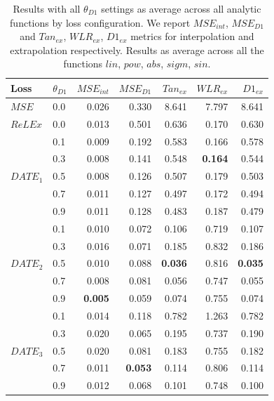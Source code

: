 \documentclass[runningheads]{llncs}
\begin{document}

\begin{table}[tb]
 \centering
 \begin{tabular}{l|l|rr|rrr}
 Loss & $\theta_{D1}$ & $MSE_{int}$ & $MSE_{D1}$ & $Tan_{ex}$ & $WLR_{ex}$ & $D1_{ex}$ \\
 \hline

 \hline
 $MSE$ & 0.0 & 0.026 & 0.330 & 8.641 & 7.797 & 8.641 \\
 $ReLEx$ & 0.0 & 0.013 & 0.501 & 0.636 & 0.170 & 0.630 \\
 
 \hline
 \multirow{5}{2cm}{$DATE_1$}& 0.1 & 0.009 & 0.192 & 0.583 & 0.166 & 0.578 \\
 & 0.3 & 0.008 & 0.141 & 0.548 & \textbf{0.164} & 0.544 \\
 & 0.5 & 0.008 & 0.126 & 0.507 & 0.179 & 0.503 \\
 & 0.7 & 0.011 & 0.127 & 0.497 & 0.172 & 0.494 \\
 & 0.9 & 0.011 & 0.128 & 0.483 & 0.187 & 0.479 \\
 
 \hline
 \multirow{5}{2cm}{$DATE_2$} & 0.1 & 0.010 & 0.072 & 0.106 & 0.719 & 0.107 \\
 & 0.3 & 0.016 & 0.071 & 0.185 & 0.832 & 0.186 \\
 & 0.5 & 0.010 & 0.088 & \textbf{0.036} & 0.816 & \textbf{0.035} \\
 & 0.7 & 0.008 & 0.081 & 0.056 & 0.747 & 0.055 \\
 & 0.9 & \textbf{0.005} & 0.059 & 0.074 & 0.755 & 0.074 \\
 
 \hline
 \multirow{5}{2cm}{$DATE_3$}& 0.1 & 0.014 & 0.118 & 0.782 & 1.263 & 0.782 \\
 & 0.3 & 0.020 & 0.065 & 0.195 & 0.737 & 0.190 \\
 & 0.5 & 0.020 & 0.081 & 0.183 & 0.755 & 0.182 \\
 & 0.7 & 0.011 & \textbf{0.053} & 0.114 & 0.806 & 0.114 \\
 & 0.9 & 0.012 & 0.068 & 0.101 & 0.748 & 0.100 \\
 \hline
 \hline

 \end{tabular}
 \caption{Results with all $\theta_{D1}$ settings as average across all analytic functions by loss configuration. 
 We report $MSE_{int}$, $MSE_{D1}$ and $Tan_{ex}$, $WLR_{ex}$, $D1_{ex}$ metrics for interpolation and extrapolation respectively.
 Results as average across all the functions $lin$, $pow$, $abs$, $sigm$, $sin$.
 }
 \label{tab:results_theta}

\end{table}
\end{document}

